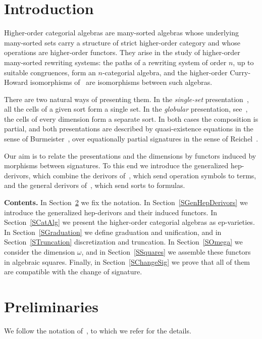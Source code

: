 \documentclass[a4paper,reqno]{amsart}
\theoremstyle{plain}
\theoremstyle{definition}
\begin{document}
\section{Introduction}\label{SIntroduction}

Higher-order categorial algebras are many-sorted algebras whose underlying many-sorted sets carry a structure of strict higher-order category and whose operations are higher-order functors.
They arise in the study of higher-order many-sorted rewriting systems: the paths of a rewriting system of order $n$, up to suitable congruences, form an $n$-categorial algebra, and the higher-order Curry-Howard isomorphisms of~\cite{CVCLRM26} are isomorphisms between such algebras.

There are two natural ways of presenting them.
In the \emph{single-set} presentation~\cite{Str87}, all the cells of a given sort form a single set.
In the \emph{globular} presentation, see~\cite{abgmmm23}, the cells of every dimension form a separate sort.
In both cases the composition is partial, and both presentations are described by quasi-existence equations in the sense of Burmeister~\cite{pb86, pb02}, over equationally partial signatures in the sense of Reichel~\cite{Rei87}.

Our aim is to relate the presentations and the dimensions by functors induced by morphisms between signatures.
To this end we introduce the generalized hep-derivors, which combine the derivors of~\cite{CVST10b}, which send operation symbols to terms, and the general derivors of~\cite{LG18}, which send sorts to formulas.

\textbf{Contents.}
In Section~\ref{SPreliminaries} we fix the notation.
In Section~\ref{SGenHepDerivors} we introduce the generalized hep-derivors and their induced functors.
In Section~\ref{SCatAlg} we present the higher-order categorial algebras as ep-varieties.
In Section~\ref{SGraduation} we define graduation and unification, and in Section~\ref{STruncation} discretization and truncation.
In Section~\ref{SOmega} we consider the dimension $\omega$, and in Section~\ref{SSquares} we assemble these functors in algebraic squares.
Finally, in Section~\ref{SChangeSig} we prove that all of them are compatible with the change of signature.

\section{Preliminaries}\label{SPreliminaries}

We follow the notation of~\cite{CVST10b, CVCLRM26}, to which we refer for the details.
\end{document}
